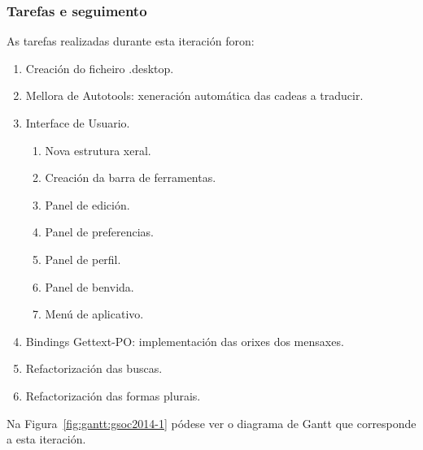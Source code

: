 \subsubsection{Tarefas e seguimento}

As tarefas realizadas durante esta iteración foron:

\begin{enumerate}[label=\bfseries WBS 1.\arabic*]
  \item Creación do ficheiro .desktop.
  \item Mellora de Autotools: xeneración automática das cadeas a traducir.
  \item Interface de Usuario.
    \begin{enumerate}[label=\bfseries WBS 1.3.\arabic*]
      \item Nova estrutura xeral.
      \item Creación da barra de ferramentas.
      \item Panel de edición.
      \item Panel de preferencias.
      \item Panel de perfil.
      \item Panel de benvida.
      \item Menú de aplicativo.
    \end{enumerate}
  \item Bindings Gettext-PO: implementación das orixes dos mensaxes.
  \item Refactorización das buscas.
  \item Refactorización das formas plurais.
\end{enumerate}

Na Figura~\ref{fig:gantt:gsoc2014-1} pódese ver o diagrama de Gantt que corresponde a esta iteración.


